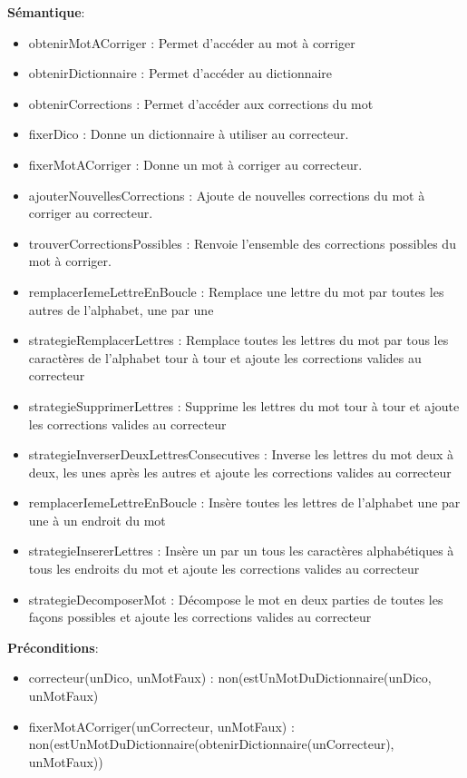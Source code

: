     \textbf{Sémantique}: \begin{itemize}[label=$\- $, leftmargin=2cm, itemsep=0cm]
        \item obtenirMotACorriger : Permet d'accéder au mot à corriger 
        \item obtenirDictionnaire : Permet d'accéder au dictionnaire 
        \item obtenirCorrections : Permet d'accéder aux corrections du mot
        \item fixerDico : Donne un dictionnaire à utiliser au correcteur.
        \item fixerMotACorriger : Donne un mot à corriger au correcteur.
        \item ajouterNouvellesCorrections : Ajoute de nouvelles corrections du mot à corriger au correcteur.
        \item trouverCorrectionsPossibles : Renvoie l'ensemble des corrections possibles du mot à corriger.
        \item remplacerIemeLettreEnBoucle : Remplace une lettre du mot par toutes les autres de l'alphabet, une par une
        \item strategieRemplacerLettres : Remplace toutes les lettres du mot par tous les caractères de l'alphabet tour à tour et ajoute les corrections valides au correcteur
        \item strategieSupprimerLettres : Supprime les lettres du mot tour à tour et ajoute les corrections valides au correcteur
        \item strategieInverserDeuxLettresConsecutives : Inverse les lettres du mot deux à deux, les unes après les autres et ajoute les corrections valides au correcteur
        \item remplacerIemeLettreEnBoucle : Insère toutes les lettres de l'alphabet une par une à un endroit du mot
        \item strategieInsererLettres : Insère un par un tous les caractères alphabétiques à tous les endroits du mot et ajoute les corrections valides au correcteur
        \item strategieDecomposerMot : Décompose le mot en deux parties de toutes les façons possibles et ajoute les corrections valides au correcteur
    \end{itemize}
        
    \textbf{Préconditions}: \begin{itemize}[label=$\- $, leftmargin=2cm, itemsep=0cm]
        \item correcteur(unDico, unMotFaux) : non(estUnMotDuDictionnaire(unDico, unMotFaux)
        \item fixerMotACorriger(unCorrecteur, unMotFaux) : \\non(estUnMotDuDictionnaire(obtenirDictionnaire(unCorrecteur), unMotFaux))
    \end{itemize}
